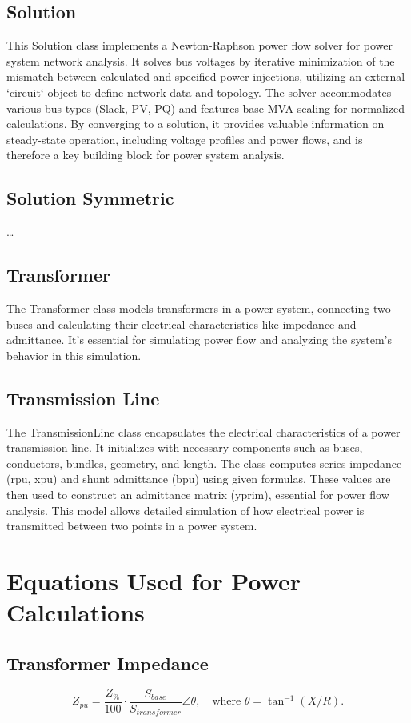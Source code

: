 \documentclass{article}
\begin{document}
	\subsection{Solution}
	This Solution class implements a Newton-Raphson power flow solver for power system network analysis. It solves bus voltages by iterative minimization of the mismatch between calculated and specified power injections, utilizing an external `circuit` object to define network data and topology. The solver accommodates various bus types (Slack, PV, PQ) and features base MVA scaling for normalized calculations. By converging to a solution, it provides valuable information on steady-state operation, including voltage profiles and power flows, and is therefore a key building block for power system analysis.

	\subsection{Solution Symmetric}
	\dots	
	
	\subsection{Transformer}
	The Transformer class models transformers in a power system, connecting two buses and calculating their electrical characteristics like impedance and admittance. It's essential for simulating power flow and analyzing the system's behavior in this simulation.
	
	\subsection{Transmission Line}
	The TransmissionLine class encapsulates the electrical characteristics of a power transmission line. It initializes with necessary components such as buses, conductors, bundles, geometry, and length. The class computes series impedance (rpu, xpu) and shunt admittance (bpu) using given formulas. These values are then used to construct an admittance matrix (yprim), essential for power flow analysis. This model allows detailed simulation of how electrical power is transmitted between two points in a power system.
	
	\section{Equations Used for Power Calculations}

	\subsection*{Transformer Impedance}
	\[ Z_{pu} = \frac{Z_\%}{100} \cdot \frac{S_{base}}{S_{transformer}} \angle{\theta}, \quad \text{where } \theta = \tan^{-1}(X/R). \]
	
\end{document}

